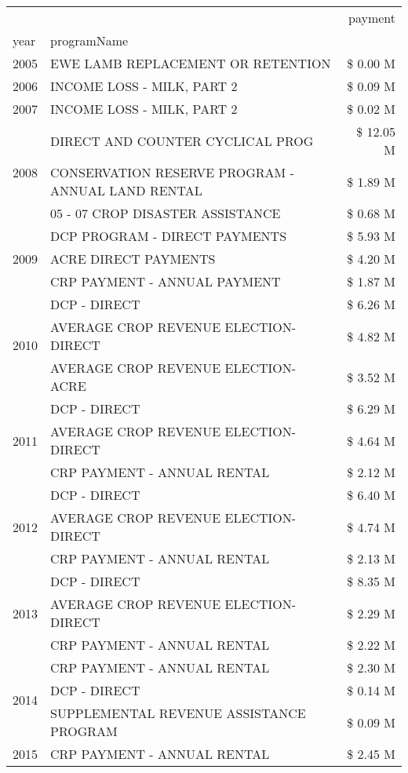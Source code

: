 \begin{tabular}{llr}
\toprule
 &  & payment \\
year & programName &  \\
\midrule
2005 & EWE LAMB REPLACEMENT OR RETENTION & \$ 0.00 M \\
\cline{1-3}
2006 & INCOME LOSS - MILK, PART 2 & \$ 0.09 M \\
\cline{1-3}
2007 & INCOME LOSS - MILK, PART 2 & \$ 0.02 M \\
\cline{1-3}
\multirow[t]{3}{*}{2008} & DIRECT AND COUNTER CYCLICAL PROG & \$ 12.05 M \\
 & CONSERVATION RESERVE PROGRAM - ANNUAL LAND RENTAL & \$ 1.89 M \\
 & 05 - 07 CROP DISASTER ASSISTANCE & \$ 0.68 M \\
\cline{1-3}
\multirow[t]{3}{*}{2009} & DCP PROGRAM - DIRECT PAYMENTS & \$ 5.93 M \\
 & ACRE DIRECT PAYMENTS & \$ 4.20 M \\
 & CRP PAYMENT - ANNUAL PAYMENT & \$ 1.87 M \\
\cline{1-3}
\multirow[t]{3}{*}{2010} & DCP - DIRECT & \$ 6.26 M \\
 & AVERAGE CROP REVENUE ELECTION-DIRECT & \$ 4.82 M \\
 & AVERAGE CROP REVENUE ELECTION-ACRE & \$ 3.52 M \\
\cline{1-3}
\multirow[t]{3}{*}{2011} & DCP - DIRECT & \$ 6.29 M \\
 & AVERAGE CROP REVENUE ELECTION-DIRECT & \$ 4.64 M \\
 & CRP PAYMENT - ANNUAL RENTAL & \$ 2.12 M \\
\cline{1-3}
\multirow[t]{3}{*}{2012} & DCP - DIRECT & \$ 6.40 M \\
 & AVERAGE CROP REVENUE ELECTION-DIRECT & \$ 4.74 M \\
 & CRP PAYMENT - ANNUAL RENTAL & \$ 2.13 M \\
\cline{1-3}
\multirow[t]{3}{*}{2013} & DCP - DIRECT & \$ 8.35 M \\
 & AVERAGE CROP REVENUE ELECTION-DIRECT & \$ 2.29 M \\
 & CRP PAYMENT - ANNUAL RENTAL & \$ 2.22 M \\
\cline{1-3}
\multirow[t]{3}{*}{2014} & CRP PAYMENT - ANNUAL RENTAL & \$ 2.30 M \\
 & DCP - DIRECT & \$ 0.14 M \\
 & SUPPLEMENTAL REVENUE ASSISTANCE PROGRAM & \$ 0.09 M \\
\cline{1-3}
\multirow[t]{3}{*}{2015} & CRP PAYMENT - ANNUAL RENTAL & \$ 2.45 M \\

\end{tabular}
